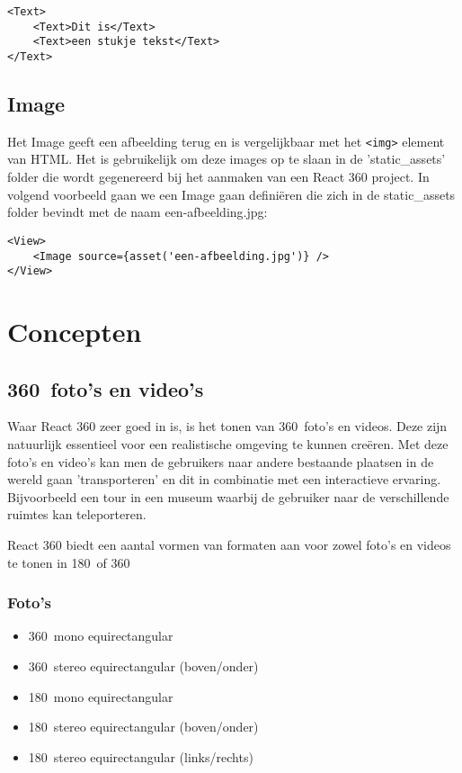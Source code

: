 \begin{lstlisting}[frame=single, caption=Het Text component met kinderen.]
<Text>
	<Text>Dit is</Text>
	<Text>een stukje tekst</Text>
</Text>
\end{lstlisting}

\subsection{Image}
\label{subsec:image}
Het Image geeft een afbeelding terug en is vergelijkbaar met het \lstinline[basicstyle=\ttfamily\color{red}]|<img>| element van HTML. Het is gebruikelijk om deze images op te slaan in de 'static\_assets' folder die wordt gegenereerd bij het aanmaken van een React 360 project. In volgend voorbeeld gaan we een Image gaan definiëren die zich in de static\_assets folder bevindt met de naam een-afbeelding.jpg:

\begin{lstlisting}[frame=single, caption=Het Image component met als bron een-afbeelding.jpg.]
<View>
	<Image source={asset('een-afbeelding.jpg')} />
</View>
\end{lstlisting}

\section{Concepten}

\subsection{360\textdegree\ foto's en video's}
\label{subsec:360-photo-video}
Waar React 360 zeer goed in is, is het tonen van 360\textdegree\ foto's en videos. Deze zijn natuurlijk essentieel voor een realistische omgeving te kunnen creëren. Met deze foto's en video's kan men de gebruikers naar andere bestaande plaatsen in de wereld gaan 'transporteren' en dit in combinatie met een interactieve ervaring. Bijvoorbeeld een tour in een museum waarbij de gebruiker naar de verschillende ruimtes kan teleporteren.

React 360 biedt een aantal vormen van formaten aan voor zowel foto's en videos te tonen in 180\textdegree\ of 360\textdegree\:

\subsubsection{Foto's}
\begin{itemize}
	\item 360\textdegree\ mono equirectangular
	\item 360\textdegree\ stereo equirectangular (boven/onder)
	\item 180\textdegree\ mono equirectangular
	\item 180\textdegree\ stereo equirectangular (boven/onder)
	\item 180\textdegree\ stereo equirectangular (links/rechts)
\end{itemize}

